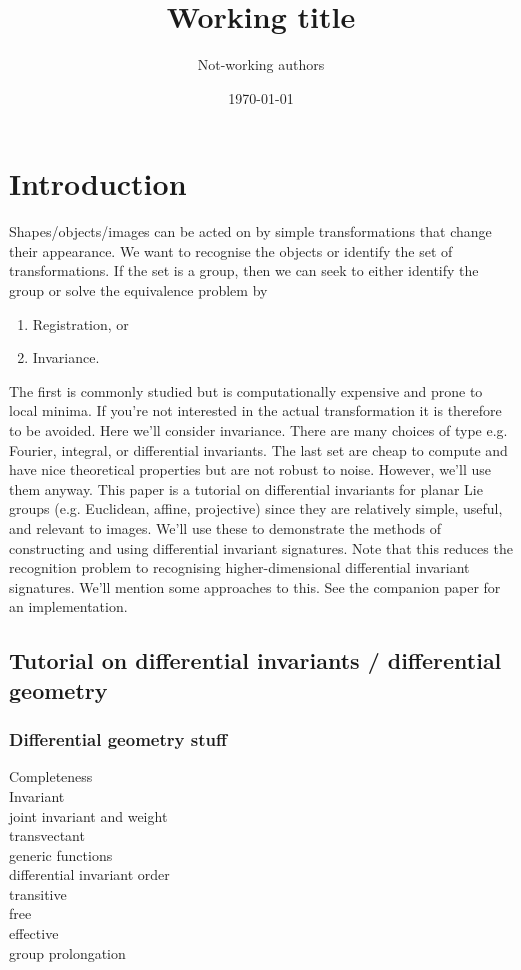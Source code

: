 \documentclass{article}
\date{\today}
\title{Working title}
\author{Not-working authors}
\begin{document}
\maketitle
\abstract{ }
\section{Introduction}
Shapes/objects/images can be acted on by simple transformations that change
their appearance. We want to recognise the objects or identify the set of
transformations. If the set is a group, then we can seek to either identify
the group or solve the equivalence problem by
\begin{enumerate}
    \item Registration, or
    \item Invariance.
\end{enumerate}
The first is commonly studied but is computationally expensive and prone to
local minima. If you're not interested in the actual transformation it is
therefore to be avoided. Here we'll consider invariance. There are many
choices of type e.g. Fourier, integral, or differential invariants. The
last set are cheap to compute and have nice theoretical properties but are
not robust to noise. However, we'll use them anyway. This paper is a
tutorial on differential invariants for planar Lie groups (e.g.
Euclidean, affine, projective) since they are relatively simple, useful,
and relevant to images. We'll use these to demonstrate the methods of
constructing and using differential invariant signatures. Note that this
reduces the recognition problem to recognising higher-dimensional
differential invariant signatures. We'll mention some approaches to this.
See the companion paper for an implementation.

\subsection{Tutorial on differential invariants / differential geometry}
\subsubsection{Differential geometry stuff}
\begin{description}
    \item[Completeness]
    \item[Invariant]
    \item[joint invariant and weight]
    \item[transvectant]
    \item[generic functions]
    \item[differential invariant order]
    \item[transitive]
    \item[free]
    \item[effective]
    \item[group prolongation]
\end{description}
\end{document}
